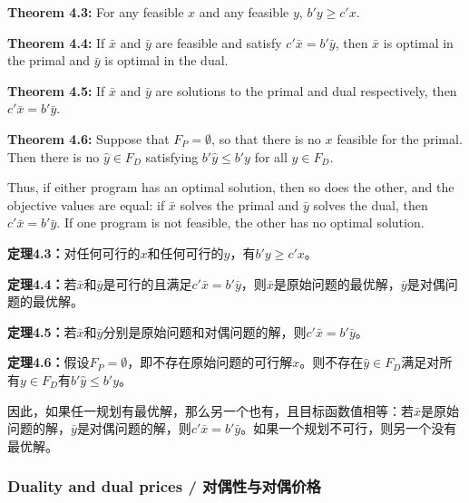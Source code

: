 \begin{original}
\textbf{Theorem 4.3:} For any feasible $x$ and any feasible $y$, $b'y \ge c'x$.

\textbf{Theorem 4.4:} If $\bar{x}$ and $\bar{y}$ are feasible and satisfy $c'\bar{x} = b'\bar{y}$, then $\bar{x}$ is optimal in the primal and $\bar{y}$ is optimal in the dual.

\textbf{Theorem 4.5:} If $\bar{x}$ and $\bar{y}$ are solutions to the primal and dual respectively, then $c'\bar{x} = b'\bar{y}$.

\textbf{Theorem 4.6:} Suppose that $F_P = \emptyset$, so that there is no $x$ feasible for the primal. Then there is no $\hat{y} \in F_D$ satisfying $b'\hat{y} \le b'y$ for all $y \in F_D$.

Thus, if either program has an optimal solution, then so does the other, and the objective values are equal: if $\bar{x}$ solves the primal and $\bar{y}$ solves the dual, then $c'\bar{x} = b'\bar{y}$. If one program is not feasible, the other has no optimal solution.
\end{original}
\begin{translation}
\textbf{定理4.3：}对任何可行的$x$和任何可行的$y$，有$b'y \ge c'x$。

\textbf{定理4.4：}若$\bar{x}$和$\bar{y}$是可行的且满足$c'\bar{x} = b'\bar{y}$，则$\bar{x}$是原始问题的最优解，$\bar{y}$是对偶问题的最优解。

\textbf{定理4.5：}若$\bar{x}$和$\bar{y}$分别是原始问题和对偶问题的解，则$c'\bar{x} = b'\bar{y}$。

\textbf{定理4.6：}假设$F_P = \emptyset$，即不存在原始问题的可行解$x$。则不存在$\hat{y} \in F_D$满足对所有$y \in F_D$有$b'\hat{y} \le b'y$。

因此，如果任一规划有最优解，那么另一个也有，且目标函数值相等：若$\bar{x}$是原始问题的解，$\bar{y}$是对偶问题的解，则$c'\bar{x} = b'\bar{y}$。如果一个规划不可行，则另一个没有最优解。
\end{translation}

\subsubsection{Duality and dual prices / 对偶性与对偶价格}

